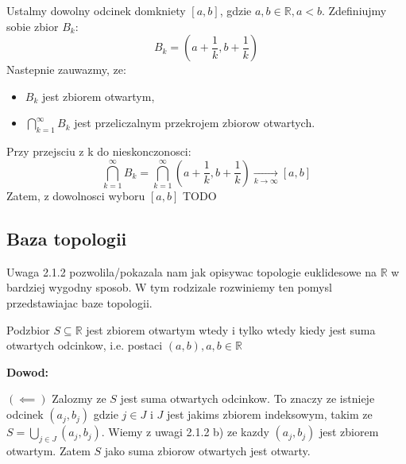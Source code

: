 \documentclass{article}
\begin{document}
\begin{enumerate}[align=left]
\begin{enumerate}[label=(\alph*)]
\begin{enumerate}[label = (\roman*)]
                            Ustalmy dowolny odcinek domkniety $[a,b]$, gdzie $a, b\in \mathbb{R}, a < b$. Zdefiniujmy sobie zbior $B_{k}$:
                            $$B_{k} = (a + \frac{1}{k}, b + \frac{1}{k})$$
                            Nastepnie zauwazmy, ze:
                            \begin{itemize}
                                \item $B_{k}$ jest zbiorem otwartym,
                                \item $\bigcap\limits_{k = 1}^{\infty}B_{k}$ jest przeliczalnym przekrojem zbiorow otwartych. 
                            \end{itemize}
                            Przy przejsciu z k do nieskonczonosci:
                            $$\bigcap\limits_{k = 1}^{\infty}B_{k} = \bigcap\limits_{k = 1}^{\infty}(a + \frac{1}{k}, b + \frac{1}{k}) \xrightarrow[k \rightarrow \infty]{} [a,b]$$
                            Zatem, z dowolnosci wyboru $[a,b]$ TODO
                     \end{enumerate}

            \end{enumerate}


\end{enumerate} %


\subsection{Baza topologii}

Uwaga 2.1.2 pozwolila/pokazala nam jak opisywac topologie euklidesowe na $\mathbb{R}$ w bardziej wygodny sposob. W tym rodzizale rozwiniemy ten pomysl przedstawiajac baze topologii.

\begin{tcolorbox}[colback=white!90!green,colframe=black!35!green,title=2.2.1 Lemat]
    Podzbior $S \subseteq \mathbb{R}$ jest zbiorem otwartym wtedy i tylko wtedy kiedy jest suma otwartych odcinkow, i.e. postaci $(a,b), a,b \in \mathbb{R}$

\end{tcolorbox}

\textbf{Dowod:}

$(\impliedby)$ Zalozmy ze $S$ jest suma otwartych odcinkow. To znaczy ze istnieje odcinek $(a_{j}, b_{j})$ gdzie $j \in J$ i $J$ jest jakims zbiorem indeksowym, takim ze $S = \bigcup\limits_{j \in J}(a_{j}, b_{j})$. Wiemy z uwagi 2.1.2 b) ze kazdy $(a_{j}, b_{j})$ jest zbiorem otwartym. Zatem $S$ jako suma zbiorow otwartych jest otwarty.
\end{document}
